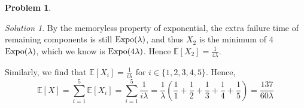 \documentclass[11pt]{article}
\theoremstyle{definition}
\newtheorem{prob}[theo]{\color{Maroon} Problem}
\theoremstyle{remark}
\newtheorem*{soln}{\color{Maroon} Solution}
\newcommand{\E}[1]{\mathbb{E}\left[ #1 \right]}
\newcommand{\Expo}{\textnormal{Expo}}
\begin{document}
\begin{prob}
\begin{enumerate}[label = (\alph*)]
\begin{soln}
    By the memoryless property of exponential, the extra failure time of remaining components is still $\Expo(\lambda)$, and thus $X_2$ is the minimum of $4$ $\Expo(\lambda)$, which we know is $\Expo(4\lambda)$. Hence $\E{X_2} = \frac{1}{4\lambda}$.
    
    Similarly, we find that $\E{X_i} = \frac{1}{i\lambda}$ for $i \in \{1,2,3,4,5\}$. Hence, $$\E{X} = \sum_{i=1}^5 \E{X_i} = \sum_{i=1}^5 \frac{1}{i\lambda} = \frac{1}{\lambda} \left( \frac{1}{1} + \frac{1}{2} + \frac{1}{3} + \frac{1}{4} + \frac{1}{5} \right) = \frac{137}{60\lambda} $$
    
    \end{soln}
\end{enumerate}

\end{prob}

\pagebreak
\end{document}
